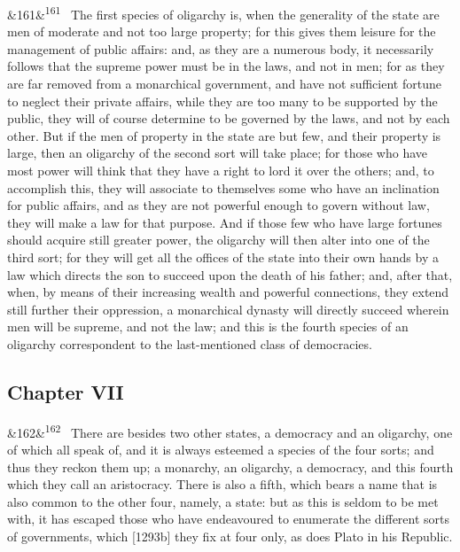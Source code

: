 \documentclass[12pt]{article}
\newcommand{\para}[1][]{\par\noindent\ifx&#1&\else\textsuperscript{\footnotesize #1}~\fi}
\begin{document}
\para[161] The first species of oligarchy is, when the generality of the state are men of moderate and not too large property; for this gives them leisure for the management of public affairs: and, as they are a numerous body, it necessarily follows that the supreme power must be in the laws, and not in men; for as they are far removed from a monarchical government, and have not sufficient fortune to neglect their private affairs, while they are too many to be supported by the public, they will of course determine to be governed by the laws, and not by each other. But if the men of property in the state are but few, and their property is large, then an oligarchy of the second sort will take place; for those who have most power will think that they have a right to lord it over the others; and, to accomplish this, they will associate to themselves some who have an inclination for public affairs, and as they are not powerful enough to govern without law, they will make a law for that purpose. And if those few who have large fortunes should acquire still greater power, the oligarchy will then alter into one of the third sort; for they will get all the offices of the state into their own hands by a law which directs the son to succeed upon the death of his father; and, after that, when, by means of their increasing wealth and powerful connections, they extend still further their oppression, a monarchical dynasty will directly succeed wherein men will be supreme, and not the law; and this is the fourth species of an oligarchy correspondent to the last-mentioned class of democracies.

\subsection*{Chapter VII}

\para[162] There are besides two other states, a democracy and an oligarchy, one of which all speak of, and it is always esteemed a species of the four sorts; and thus they reckon them up; a monarchy, an oligarchy, a democracy, and this fourth which they call an aristocracy. There is also a fifth, which bears a name that is also common to the other four, namely, a state: but as this is seldom to be met with, it has escaped those who have endeavoured to enumerate the different sorts of governments, which [1293b] they fix at four only, as does Plato in his Republic.
\end{document}
